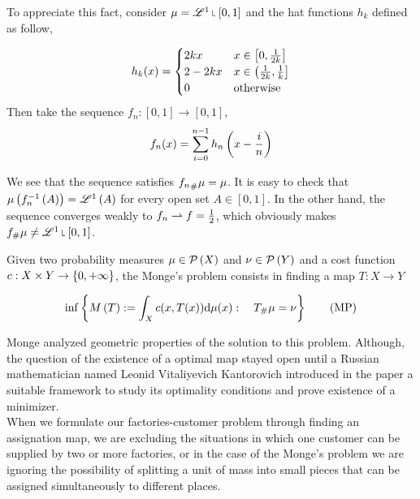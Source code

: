 To appreciate this fact, consider $\mu = \Lebesgue^1\measurerestr[0,1]$ and the hat functions $h_k$ defined as follow,

\begin{equation*}
	h_k(x)=\begin{cases}
		2kx & x\in\left[ 0, \frac{1}{2k} \right]\\
		2-2kx & x\in \left(\frac{1}{2k}, \frac{1}{k}\right] \\
		0 & \text{otherwise}
	\end{cases}
\end{equation*}
Then take the sequence $f_n:[0,1]\rightarrow [0,1]$,
\begin{equation}
	f_n(x)=\sum_{i=0}^{n-1}h_n\left( x-\frac{i}{n} \right)
\end{equation}


We see that the sequence satisfies ${f_{n}}_{\#} \mu=\mu$. It is easy to check that $\mu\left( f_n^{-1}\left(A\right) \right)=\mathscr{L}^1\left( A \right)$ for every open set $A\in [0,1]$. In the other hand, the sequence converges weakly to $f_n\rightharpoonup f=\frac{1}{2}$, which obviously makes $\Tmeasure{\mu}{f}\neq\Lebesgue^1\measurerestr [0,1]$. 


\begin{problem} Given two probability measures $\mu \in \mathcal{P}\left( X \right)$ and $\nu \in \mathcal{P}\left( Y \right)$ and a cost function $c: X \times Y \rightarrow \left\lbrace 0, +\infty \right\rbrace$, the Monge's problem consists in finding a map $T:X\rightarrow Y$
	
\begin{equation}
\inf\left\lbrace M\left(T\right):=\int_X c(x, T(x)) \mathrm{d} \mu(x): \quad {T}_{\#} \mu=\nu  \right\rbrace\label{eq: Monge's Problem.}\tag{MP}
\end{equation}
\end{problem}

Monge analyzed geometric properties of the solution to this problem. Although, the question of the existence of a optimal map stayed open until a Russian mathematician named Leonid Vitaliyevich Kantorovich introduced in the paper \cite{Kantorovich1942} a suitable framework to study its optimality conditions and prove existence of a minimizer. \\

When we formulate our factories-customer problem through finding an assignation map, we are excluding the situations in which one customer can be supplied by two or more factories, or in the case of the Monge's problem we are ignoring the possibility of splitting a unit of mass into small pieces that can be assigned simultaneously to different places. \\

